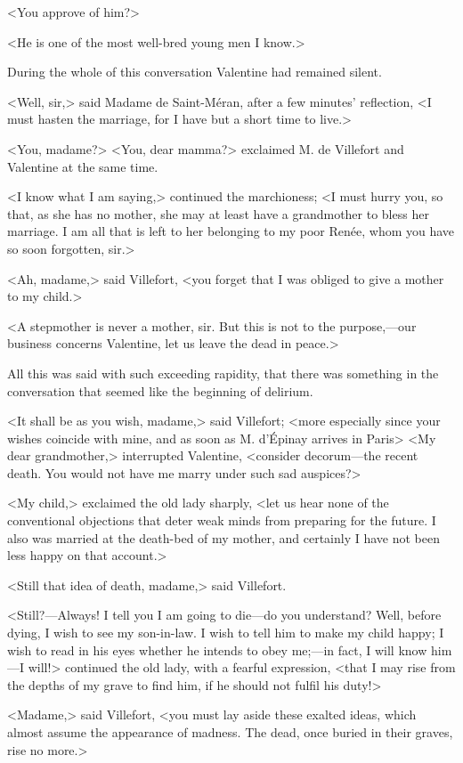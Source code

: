  <You approve of him?> 

 <He is one of the most well-bred young men I know.> 

 During the whole of this conversation Valentine had remained silent. 

 <Well, sir,> said Madame de Saint-Méran, after a few minutes' reflection, <I must hasten the marriage, for I have but a short time to live.> 

 <You, madame?> <You, dear mamma?> exclaimed M. de Villefort and Valentine at the same time. 

 <I know what I am saying,> continued the marchioness; <I must hurry you, so that, as she has no mother, she may at least have a grandmother to bless her marriage. I am all that is left to her belonging to my poor Renée, whom you have so soon forgotten, sir.> 

 <Ah, madame,> said Villefort, <you forget that I was obliged to give a mother to my child.> 

 <A stepmother is never a mother, sir. But this is not to the purpose,—our business concerns Valentine, let us leave the dead in peace.> 

 All this was said with such exceeding rapidity, that there was something in the conversation that seemed like the beginning of delirium. 

 <It shall be as you wish, madame,> said Villefort; <more especially since your wishes coincide with mine, and as soon as M. d'Épinay arrives in Paris\longdash>  <My dear grandmother,> interrupted Valentine, <consider decorum—the recent death. You would not have me marry under such sad auspices?> 

 <My child,> exclaimed the old lady sharply, <let us hear none of the conventional objections that deter weak minds from preparing for the future. I also was married at the death-bed of my mother, and certainly I have not been less happy on that account.> 

 <Still that idea of death, madame,> said Villefort. 

 <Still?—Always! I tell you I am going to die—do you understand? Well, before dying, I wish to see my son-in-law. I wish to tell him to make my child happy; I wish to read in his eyes whether he intends to obey me;—in fact, I will know him—I will!> continued the old lady, with a fearful expression, <that I may rise from the depths of my grave to find him, if he should not fulfil his duty!> 

 <Madame,> said Villefort, <you must lay aside these exalted ideas, which almost assume the appearance of madness. The dead, once buried in their graves, rise no more.> 

